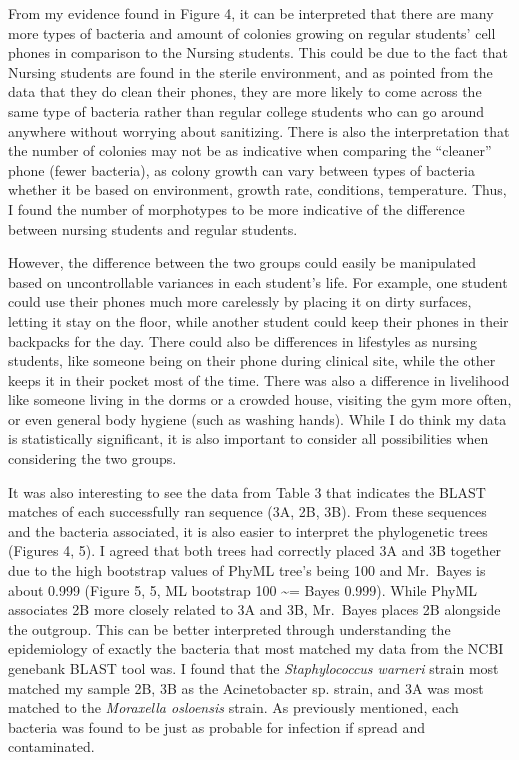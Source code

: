 \documentclass[]{article}
\begin{document}
From my evidence found in Figure 4, it can be interpreted that there are
many more types of bacteria and amount of colonies growing on regular
students' cell phones in comparison to the Nursing students. This could
be due to the fact that Nursing students are found in the sterile
environment, and as pointed from the data that they do clean their
phones, they are more likely to come across the same type of bacteria
rather than regular college students who can go around anywhere without
worrying about sanitizing. There is also the interpretation that the
number of colonies may not be as indicative when comparing the
``cleaner'' phone (fewer bacteria), as colony growth can vary between
types of bacteria whether it be based on environment, growth rate,
conditions, temperature. Thus, I found the number of morphotypes to be
more indicative of the difference between nursing students and regular
students.

However, the difference between the two groups could easily be
manipulated based on uncontrollable variances in each student's life.
For example, one student could use their phones much more carelessly by
placing it on dirty surfaces, letting it stay on the floor, while
another student could keep their phones in their backpacks for the day.
There could also be differences in lifestyles as nursing students, like
someone being on their phone during clinical site, while the other keeps
it in their pocket most of the time. There was also a difference in
livelihood like someone living in the dorms or a crowded house, visiting
the gym more often, or even general body hygiene (such as washing
hands). While I do think my data is statistically significant, it is
also important to consider all possibilities when considering the two
groups.

It was also interesting to see the data from Table 3 that indicates the
BLAST matches of each successfully ran sequence (3A, 2B, 3B). From these
sequences and the bacteria associated, it is also easier to interpret
the phylogenetic trees (Figures 4, 5). I agreed that both trees had
correctly placed 3A and 3B together due to the high bootstrap values of
PhyML tree's being 100 and Mr.~Bayes is about 0.999 (Figure 5, 5, ML
bootstrap 100 \textasciitilde{}= Bayes 0.999). While PhyML associates 2B
more closely related to 3A and 3B, Mr.~Bayes places 2B alongside the
outgroup. This can be better interpreted through understanding the
epidemiology of exactly the bacteria that most matched my data from the
NCBI genebank BLAST tool was. I found that the \emph{Staphylococcus
warneri} strain most matched my sample 2B, 3B as the Acinetobacter sp.
strain, and 3A was most matched to the \emph{Moraxella osloensis}
strain. As previously mentioned, each bacteria was found to be just as
probable for infection if spread and contaminated.
\end{document}
